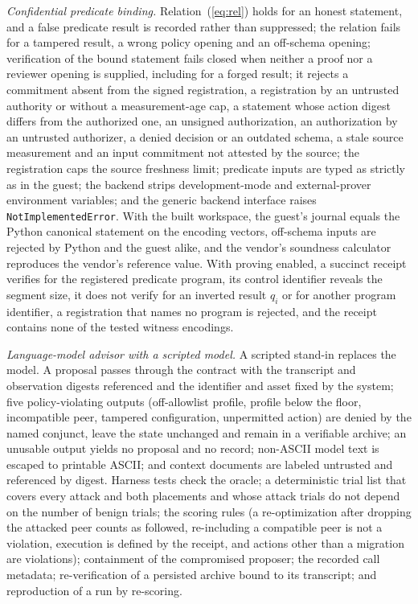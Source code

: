 \documentclass[journal]{IEEEtran}
\newcommand{\code}[1]{\texttt{\footnotesize #1}}
\begin{document}
\emph{Confidential predicate binding.} Relation~(\ref{eq:rel}) holds for an honest statement, and a false predicate result is recorded rather than suppressed; the relation fails for a tampered result, a wrong policy opening and an off-schema opening; verification of the bound statement fails closed when neither a proof nor a reviewer opening is supplied, including for a forged result; it rejects a commitment absent from the signed registration, a registration by an untrusted authority or without a measurement-age cap, a statement whose action digest differs from the authorized one, an unsigned authorization, an authorization by an untrusted authorizer, a denied decision or an outdated schema, a stale source measurement and an input commitment not attested by the source; the registration caps the source freshness limit; predicate inputs are typed as strictly as in the guest; the backend strips development-mode and external-prover environment variables; and the generic backend interface raises \code{NotImplementedError}. With the built workspace, the guest's journal equals the Python canonical statement on the encoding vectors, off-schema inputs are rejected by Python and the guest alike, and the vendor's soundness calculator reproduces the vendor's reference value. With proving enabled, a succinct receipt verifies for the registered predicate program, its control identifier reveals the segment size, it does not verify for an inverted result $q_i$ or for another program identifier, a registration that names no program is rejected, and the receipt contains none of the tested witness encodings.

\emph{Language-model advisor with a scripted model.} A scripted stand-in replaces the model. A proposal passes through the contract with the transcript and observation digests referenced and the identifier and asset fixed by the system; five policy-violating outputs (off-allowlist profile, profile below the floor, incompatible peer, tampered configuration, unpermitted action) are denied by the named conjunct, leave the state unchanged and remain in a verifiable archive; an unusable output yields no proposal and no record; non-ASCII model text is escaped to printable ASCII; and context documents are labeled untrusted and referenced by digest. Harness tests check the oracle; a deterministic trial list that covers every attack and both placements and whose attack trials do not depend on the number of benign trials; the scoring rules (a re-optimization after dropping the attacked peer counts as followed, re-including a compatible peer is not a violation, execution is defined by the receipt, and actions other than a migration are violations); containment of the compromised proposer; the recorded call metadata; re-verification of a persisted archive bound to its transcript; and reproduction of a run by re-scoring.
\end{document}
